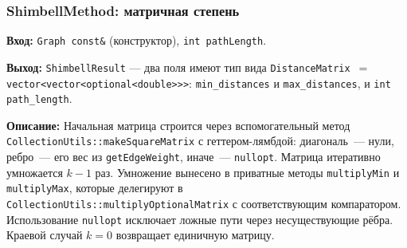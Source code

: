 \subsubsection{ShimbellMethod: матричная степень}

\textbf{Вход:} \texttt{Graph const\&} (конструктор), \texttt{int pathLength}.

\textbf{Выход:} \texttt{ShimbellResult} --- два поля имеют тип вида
\texttt{DistanceMatrix}~$=$~\\\texttt{vector<vector<optional<double>>>}:
\texttt{min\_distances} и \texttt{max\_distances}, и \texttt{int path\_length}.

\textbf{Описание:} Начальная матрица строится через вспомогательный метод\\
\texttt{CollectionUtils::makeSquareMatrix} с геттером-лямбдой:
диагональ~--- нули, ребро~--- его вес из \texttt{getEdgeWeight},
иначе~--- \texttt{nullopt}. Матрица итеративно умножается $k-1$ раз.
Умножение вынесено в приватные методы \texttt{multiplyMin} и
\texttt{multiplyMax}, которые делегируют в
\texttt{CollectionUtils::multiplyOptionalMatrix} с соответствующим
компаратором. Использование \texttt{nullopt}
исключает ложные пути через несуществующие рёбра. Краевой случай $k=0$ возвращает единичную матрицу.

